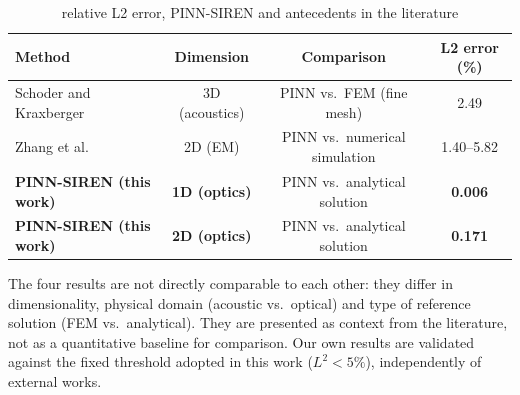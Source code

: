 \begin{table}[t]
\centering
\renewcommand{\arraystretch}{1.2}
\caption{relative L2 error, PINN-SIREN and antecedents in the literature}
\label{tab:comparison}
\begin{tabular}{lccc}
\hline
Method & Dimension & Comparison & L2 error (\%) \\
\hline
Schoder and Kraxberger \cite{Schoder2024_PINN_acoustics} & 3D (acoustics) & PINN vs.\ FEM (fine mesh) & 2.49 \\
Zhang et al. \cite{Zhang2025_FEPIRBN} & 2D (EM) & PINN vs.\ numerical simulation & 1.40--5.82 \\
\textbf{PINN-SIREN (this work)} & \textbf{1D (optics)} & PINN vs.\ analytical solution & \textbf{0.006} \\
\textbf{PINN-SIREN (this work)} & \textbf{2D (optics)} & PINN vs.\ analytical solution & \textbf{0.171} \\
\hline
\end{tabular}

\vspace{4pt}
\begin{minipage}{\textwidth}
\footnotesize The four results are not directly comparable to each other:
they differ in dimensionality, physical domain (acoustic vs.\ optical) and type of
reference solution (FEM vs.\ analytical). They are presented as context from the
literature, not as a quantitative baseline for comparison. Our own results are
validated against the fixed threshold adopted in this work ($L^2 < 5\%$),
independently of external works.
\end{minipage}
\end{table}
